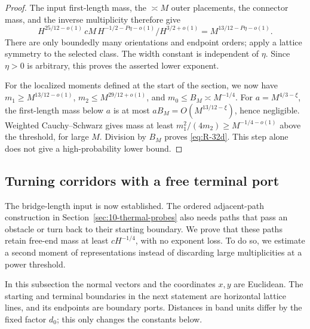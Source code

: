 \begin{proof}
The input first-length mass, the \(\asymp M\) outer placements, the
connector mass, and the inverse multiplicity therefore give
\[
 H^{25/12-o(1)}\,cM\,H^{-1/2-P\eta-o(1)}
        /H^{3/2+o(1)}
        =M^{13/12-P\eta-o(1)}.
\]
There are only boundedly many orientations and endpoint orders; apply a
lattice symmetry to the selected class. The width constant is independent
of \(\eta\). Since \(\eta>0\) is arbitrary, this proves the asserted
lower exponent.

For the localized moments defined at the start of the section, we now
have \(m_1\ge M^{13/12-o(1)}\),
\(m_2\le M^{29/12+o(1)}\), and \(m_0\le B_M\asymp M^{-1/4}\).
For \(a=M^{4/3-\xi}\), the first-length mass below \(a\) is at most
\(aB_M=O(M^{13/12-\xi})\), hence negligible. Weighted
Cauchy--Schwarz gives mass at least
\(m_1^2/(4m_2)\ge M^{-1/4-o(1)}\) above the threshold, for large
\(M\). Division by \(B_M\) proves \eqref{eq:R-32d}. This step alone
does not give a high-probability lower bound.
\end{proof}

\FloatBarrier
\subsection{Turning corridors with a free terminal port}

The bridge-length input is now established. The ordered adjacent-path
construction in Section~\ref{sec:10-thermal-probes} also needs paths
that pass an obstacle or turn back to their starting boundary. We prove
that these paths retain free-end mass at least $cH^{-1/4}$, with no
exponent loss. To do so, we estimate a second moment of representations
instead of discarding large multiplicities at a power threshold.

In this subsection the normal vectors and the coordinates $x,y$ are
Euclidean. The starting and terminal boundaries in the next statement
are horizontal lattice lines, and its endpoints are boundary ports.
Distances in band units differ by the fixed factor $d_0$; this only
changes the constants below.


